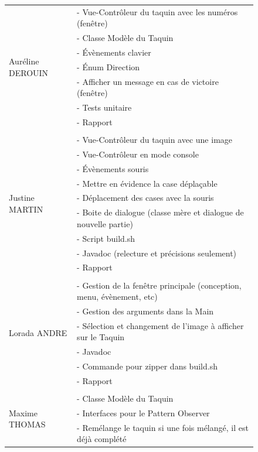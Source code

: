 		\begin{figure}[H]
			\begin{center}
				\begin{tabular}{l l}
				\multirow{7}{4em}{Auréline DEROUIN}
					& - Vue-Contrôleur du taquin avec les numéros (fenêtre)\\
					& - Classe Modèle du Taquin\\
					& - Évènements clavier\\
					& - Énum Direction\\
					& - Afficher un message en cas de victoire (fenêtre)\\
					& - Tests unitaire\\
					& - Rapport\\
				 & \\

				\multirow{9}{4em}{Justine MARTIN}
					& - Vue-Contrôleur du taquin avec une image\\
					& - Vue-Contrôleur en mode console\\
					& - Évènements souris\\
					& - Mettre en évidence la case déplaçable\\
					& - Déplacement des cases avec la souris\\
					& - Boite de dialogue (classe mère et dialogue de nouvelle partie)\\
					& - Script build.sh\\
					& - Javadoc (relecture et précisions seulement)\\
					& - Rapport\\
				 & \\

				\multirow{6}{4em}{Lorada ANDRE}
					& - Gestion de la fenêtre principale (conception, menu, évènement, etc)\\
					& - Gestion des arguments dans la Main\\
					& - Sélection et changement de l'image à afficher sur le Taquin\\
					& - Javadoc\\
					& - Commande pour zipper dans build.sh\\
					& - Rapport\\
				 & \\

				\multirow{3}{4em}{Maxime THOMAS}
					& - Classe Modèle du Taquin\\
					& - Interfaces pour le Pattern Observer\\
					& - Remélange le taquin si une fois mélangé, il est déjà complété\\

				\end{tabular}
			\end{center}
		\end{figure}
